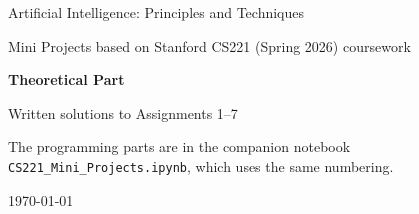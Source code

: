 \documentclass[11pt,a4paper]{article}
\begin{document}
\begin{titlepage}
  \centering
  {\Large Artificial Intelligence: Principles and Techniques\par}
  \vspace{0.5em}
  {\large Mini Projects based on Stanford CS221 (Spring 2026) coursework\par}
  \vspace{2.5em}
  {\Huge\bfseries Theoretical Part\par}
  \vspace{0.5em}
  {\large Written solutions to Assignments 1--7\par}
  \vspace{3em}
  {\large\bfseries \teamname\par}
  \vspace{1em}
  \teamtable
  \vfill
  {\small The programming parts are in the companion notebook
   \texttt{CS221\_Mini\_Projects.ipynb}, which uses the same numbering.\par}
  \vspace{1em}
  {\large \today\par}
\end{titlepage}

\tableofcontents








\end{document}
